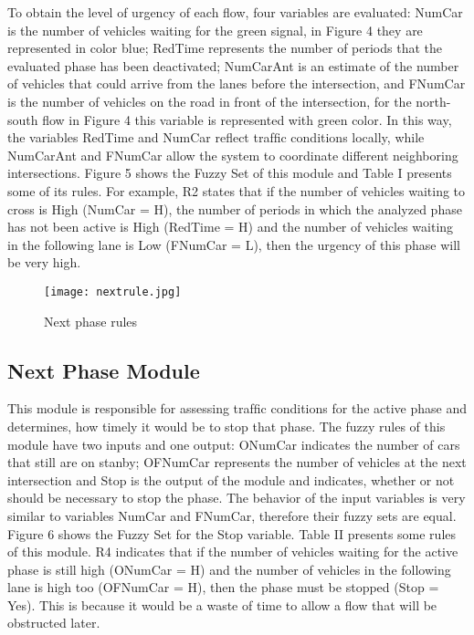 \documentclass{SureshLimkar}
\begin{document}
\hspace {0.5 in} To obtain the level of urgency of each ﬂow, four variables
are evaluated: NumCar is the number of vehicles waiting
for the green signal, in Figure 4 they are represented in
color blue; RedTime represents the number of periods that
the evaluated phase has been deactivated; NumCarAnt is
an estimate of the number of vehicles that could arrive
from the lanes before the intersection, and FNumCar is
the number of vehicles on the road in front of the intersection, for the north-south ﬂow in Figure 4 this variable
is represented with green color. In this way, the variables
RedTime and NumCar reﬂect trafﬁc conditions locally,
while NumCarAnt and FNumCar allow the system to
coordinate different neighboring intersections.
Figure 5 shows the Fuzzy Set of this module and Table I
presents some of its rules. For example, R2 states that if
the number of vehicles waiting to cross is High (NumCar
= H), the number of periods in which the analyzed phase
has not been active is High (RedTime = H) and the
number of vehicles waiting in the following lane is Low
(FNumCar = L), then the urgency of this phase will be very high.

\begin{figure}[h]%
\centering
 \texttt{[image: nextrule.jpg]}%
\caption{Next phase rules}%
\label{Next phase rules}%
\end{figure}


\subsection{Next Phase Module}
\hspace{0.5 in} This module is responsible for assessing trafﬁc conditions
for the active phase and determines, how timely it would
be to stop that phase. The fuzzy rules of this module
have two inputs and one output: ONumCar indicates
the number of cars that still are on stanby; OFNumCar
represents the number of vehicles at the next intersection
and Stop is the output of the module and indicates,
whether or not should be necessary to stop the phase.
The behavior of the input variables is very similar to
variables NumCar and FNumCar, therefore their fuzzy
sets are equal. Figure 6 shows the Fuzzy Set for the Stop
variable.
Table II presents some rules of this module. R4 indicates
that if the number of vehicles waiting for the active phase
is still high (ONumCar = H) and the number of vehicles
in the following lane is high too (OFNumCar = H), then
the phase must be stopped (Stop = Yes). This is because
it would be a waste of time to allow a ﬂow that will be
obstructed later.
\end{document}
